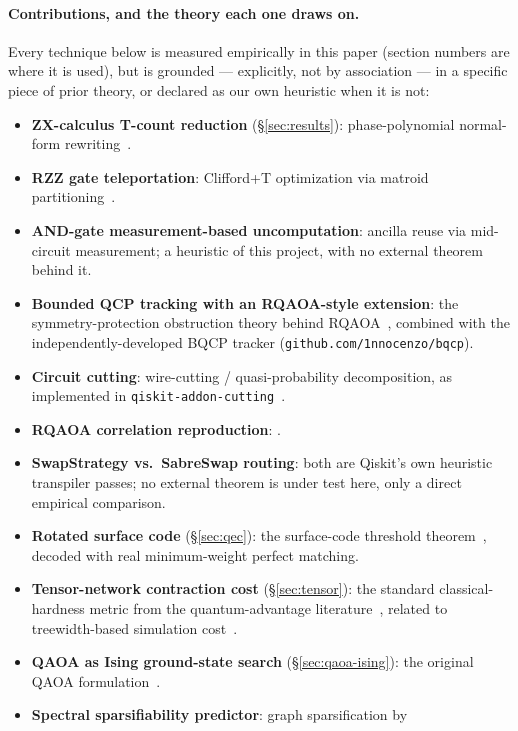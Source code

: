 \documentclass[9pt,twocolumn]{extarticle}
\begin{document}
\paragraph{Contributions, and the theory each one draws on.} Every
technique below is measured empirically in this paper (section numbers are
where it is used), but is grounded --- explicitly, not by association --- in
a specific piece of prior theory, or declared as our own heuristic when it
is not:
\begin{itemize}[leftmargin=*,itemsep=1pt,topsep=2pt]
\item \textbf{ZX-calculus T-count reduction} (\S\ref{sec:results}):
phase-polynomial normal-form rewriting~\cite{kissinger2019}.
\item \textbf{RZZ gate teleportation}: Clifford+T optimization via matroid
partitioning~\cite{amy2014}.
\item \textbf{AND-gate measurement-based uncomputation}: ancilla reuse via
mid-circuit measurement; a heuristic of this project, with no external
theorem behind it.
\item \textbf{Bounded QCP tracking with an RQAOA-style extension}: the
symmetry-protection obstruction theory behind RQAOA~\cite{bravyi2020},
combined with the independently-developed BQCP tracker
(\texttt{github.com/1nnocenzo/bqcp}).
\item \textbf{Circuit cutting}: wire-cutting / quasi-probability
decomposition, as implemented in \texttt{qiskit-addon-cutting}~\cite{qiskitcutting}.
\item \textbf{RQAOA correlation reproduction}: \cite{bravyi2020}.
\item \textbf{SwapStrategy vs.\ SabreSwap routing}: both are Qiskit's own
heuristic transpiler passes; no external theorem is under test here, only
a direct empirical comparison.
\item \textbf{Rotated surface code} (\S\ref{sec:qec}): the surface-code
threshold theorem~\cite{fowler2012}, decoded with real minimum-weight
perfect matching.
\item \textbf{Tensor-network contraction cost} (\S\ref{sec:tensor}): the
standard classical-hardness metric from the quantum-advantage
literature~\cite{boixo2018}, related to treewidth-based simulation
cost~\cite{markovshi2008}.
\item \textbf{QAOA as Ising ground-state search} (\S\ref{sec:qaoa-ising}):
the original QAOA formulation~\cite{farhi2014}.
\item \textbf{Spectral sparsifiability predictor}: graph sparsification by

\end{itemize}
\end{document}
